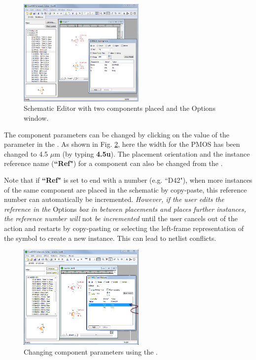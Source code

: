 \begin{figure}
    \includegraphics[width=0.55\textwidth]{./figures/getting_started_figures/CoolSPICE_SchematicEditorwithDevicesandOptions.png}
	\caption{{Schematic Editor with two components placed and the \textsf{Options} window.}}
  \label{fig_schematiceditor_devicesandoptions}
\end{figure}

%
  The component parameters can be changed by clicking on the value of the parameter in the .  As shown in Fig. \ref{fig_schematiceditor_changePMOSwidth}, here the width for the PMOS has been changed to 4.5 $\mu$m (by typing {\bf{\textsf{4.5u}}}).  The placement orientation and the instance reference name (\textbf{``Ref"}) for a component can also be changed from the .  

Note that if \textbf{``Ref"} is set to end with a number (e.g. ``D42"), when more instances of the same component are placed in the schematic by copy-paste, this reference number can automatically be incremented.  \emph{However, if the user edits the reference in the} {\textsf{Options}} \emph{box in between placements and places further instances, the reference number will} not \emph{be incremented} until the user cancels out of the action and restarts by copy-pasting or selecting the left-frame representation of the symbol to create a new instance.  This can lead to netlist conflicts. 

\begin{figure}
    \includegraphics[width=0.55\textwidth]{./figures/getting_started_figures/SchematicEditor_ChangePMOSWidth.png}
    \caption{Changing component parameters using the .}
  \label{fig_schematiceditor_changePMOSwidth}
\end{figure}

